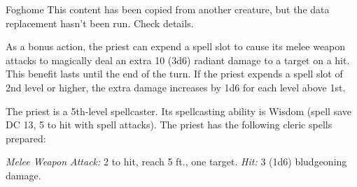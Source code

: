 \documentclass[10pt,a4paper,twoside,bg=print,twocolumn,openany,nodeprecatedcode]{dndbook}
\begin{document}
\begin{DndMonster}[float=t]{Foghome}
\DndMonsterBasics[
armor-class = {13 (\textit{chain shirt})},
hit-points = {\DndDice{5d8 + 5}},
speed = {30 ft.}
]
\DndMonsterAbilityScores[
 str = 10,
 dex = 10,
 con = 12,
 int = 13,
 wis = 16,
 cha = 13
]
\DndMonsterDetails[
skills = {Medicine +7, Persuasion +3, Religion +5},
languages = {any two languages},
challenge = 2,
]
This content has been copied from another creature, but the data replacement hasn't been run. Check details.

As a bonus action, the priest can expend a spell slot to cause its melee weapon attacks to magically deal an extra 10 (3d6) radiant damage to a target on a hit. This benefit lasts until the end of the turn. If the priest expends a spell slot of 2nd level or higher, the extra damage increases by 1d6 for each level above 1st.

The priest is a 5th-level spellcaster. Its spellcasting ability is Wisdom (spell save DC 13, 5 to hit with spell attacks). The priest has the following cleric spells prepared:
\begin{DndMonsterSpells}
\end{DndMonsterSpells}
\textsl{Melee Weapon Attack:} 2 to hit, reach 5 ft., one target. \textsl{Hit:} 3 (1d6) bludgeoning damage.

\end{DndMonster}
\end{document}
